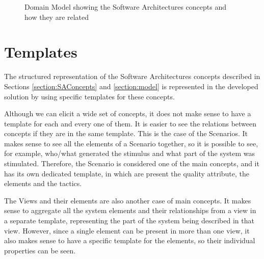 \begin{figure}
\caption{Domain Model showing the Software Architectures concepts and how they are related}
\label{figure:abstractDomainModel}
\end{figure}

\section{Templates}
The structured representation of the Software Architectures concepts described in Sections \ref{section:SAConcepts} and \ref{section:model} is represented in the developed solution by using specific templates for these concepts.

Although we can elicit a wide set of concepts, it does not make sense to have a template for each and every one of them. It is easier to see the relations between concepts if they are in the same template. This is the case of the Scenarios. It makes sense to see all the elements of a Scenario together, so it is possible to see, for example, who/what generated the stimulus and what part of the system was stimulated. Therefore, the Scenario is considered one of the main concepts, and it has its own dedicated template, in which are present the quality attribute, the elements and the tactics. 

The Views and their elements are also another case of main concepts. It makes sense to aggregate all the system elements and their relationships from a view in a separate template, representing the part of the system being described in that view. However, since a single element can be present in more than one view, it also makes sense to have a specific template for the elements, so their individual properties can be seen.



